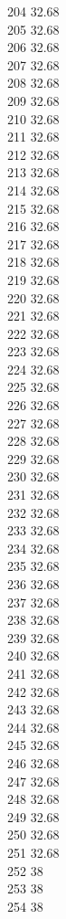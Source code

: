 204	32.68\\
205	32.68\\
206	32.68\\
207	32.68\\
208	32.68\\
209	32.68\\
210	32.68\\
211	32.68\\
212	32.68\\
213	32.68\\
214	32.68\\
215	32.68\\
216	32.68\\
217	32.68\\
218	32.68\\
219	32.68\\
220	32.68\\
221	32.68\\
222	32.68\\
223	32.68\\
224	32.68\\
225	32.68\\
226	32.68\\
227	32.68\\
228	32.68\\
229	32.68\\
230	32.68\\
231	32.68\\
232	32.68\\
233	32.68\\
234	32.68\\
235	32.68\\
236	32.68\\
237	32.68\\
238	32.68\\
239	32.68\\
240	32.68\\
241	32.68\\
242	32.68\\
243	32.68\\
244	32.68\\
245	32.68\\
246	32.68\\
247	32.68\\
248	32.68\\
249	32.68\\
250	32.68\\
251	32.68\\
252	38\\
253	38\\
254	38\\
